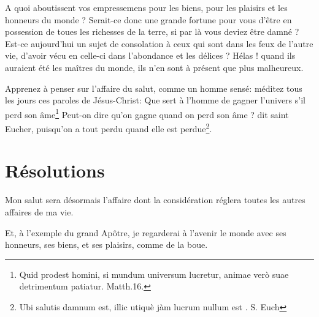 \documentclass[instructions.tex]{subfiles}
\begin{document}
A quoi aboutissent vos empressemens pour les biens, pour les plaisirs et les honneurs du monde ? Serait-ce donc une grande fortune pour vous d'être en possession de toues les richesses de la terre, si par là vous deviez être damné ? Est-ce aujourd'hui un sujet de consolation à ceux qui sont dans les feux de l'autre vie, d'avoir vécu en celle-ci dans l'abondance et les délices ? Hélas ! quand ils auraient été les maîtres du monde, ils n'en sont à présent que plus malheureux. 

Apprenez à penser sur l'affaire du salut, comme un homme sensé: méditez tous les jours ces paroles de Jésus-Christ: Que sert à l'homme de gagner l'univers s'il perd son âme\footnote{Quid prodest homini, si mundum universum lucretur, animae verò suae detrimentum patiatur. Matth.16.} Peut-on dire qu'on gagne quand on perd son âme ? dit saint Eucher, puisqu'on a tout perdu quand elle est perdue\footnote{Ubi salutis damnum est, illic utiquè jàm lucrum nullum est . S. Euch}.
\section{Résolutions}

\primo Mon salut sera désormais l'affaire dont la considération réglera toutes les autres affaires de ma vie. 

\secundo Et, à l'exemple du grand Apôtre, je regarderai à l'avenir le monde avec ses honneurs, ses biens, et ses plaisirs, comme de la boue.

\end{document}
